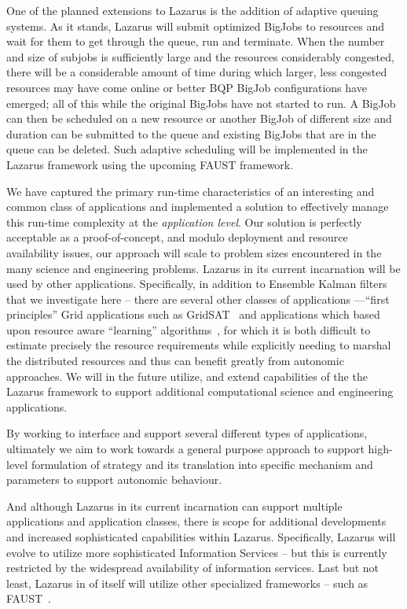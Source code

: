 \documentclass[conference,final]{IEEEtran}
\begin{document}
One of the planned extensions to Lazarus is the addition of adaptive
queuing systems. As it stands, Lazarus will submit optimized BigJobs
to resources and wait for them to get through the queue, run and
terminate.  When the number and size of subjobs is sufficiently large
and the resources considerably congested, there will be a considerable
amount of time during which larger, less congested resources may have
come online or better BQP BigJob configurations have emerged; all of
this while the original BigJobs have not started to run. A BigJob can
then be scheduled on a new resource or another BigJob of different
size and duration can be submitted to the queue and existing BigJobs
that are in the queue can be deleted.  Such adaptive scheduling will
be implemented in the Lazarus framework using the upcoming FAUST
framework.

We have captured the primary run-time characteristics of an
interesting and common class of applications and implemented a
solution to effectively manage this run-time complexity at the {\it
  application level}.  Our solution is perfectly acceptable as a
proof-of-concept, and modulo deployment and resource availability
issues, our approach will scale to problem sizes encountered in the
many science and engineering problems.  Lazarus in its current
incarnation will be used by other applications. Specifically, in
addition to Ensemble Kalman filters %
that we investigate here -- there are several other classes of
applications ---``first principles'' Grid applications such as
GridSAT~\cite{gridsat03} and applications which based upon resource
aware ``learning'' algorithms~\cite{ majority_voting}, for which it is
both difficult to estimate precisely the resource requirements while
explicitly needing to marshal the distributed resources and thus can
benefit greatly from autonomic approaches. We will in the future
utilize, and extend capabilities of the the Lazarus framework to
support additional computational science and engineering applications.

By working to interface and support several different types of
applications, ultimately we aim to work towards a general purpose
approach to support high-level formulation of strategy and its
translation into specific mechanism and parameters to support
autonomic behaviour.

And although Lazarus in its current incarnation can support multiple
applications and application classes, there is scope for additional
developments and increased sophisticated capabilities within Lazarus.
Specifically, Lazarus will evolve to utilize more sophisticated
Information Services -- but this is currently restricted by the
widespread availability of information services. Last but not least,
Lazarus in of itself will utilize other specialized frameworks -- such
as FAUST~\cite{faust_url}.
\end{document}
